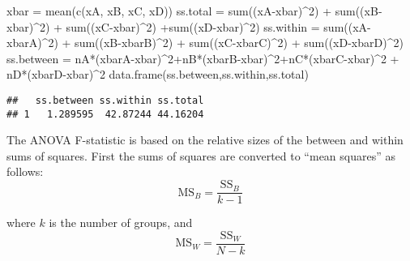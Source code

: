 \documentclass[
]{article}
\newenvironment{Shaded}{\begin{snugshade}}{\end{snugshade}}
\newcommand{\DecValTok}[1]{\textcolor[rgb]{0.00,0.00,0.81}{#1}}
\newcommand{\FunctionTok}[1]{\textcolor[rgb]{0.00,0.00,0.00}{#1}}
\newcommand{\NormalTok}[1]{#1}
\newcommand{\OtherTok}[1]{\textcolor[rgb]{0.56,0.35,0.01}{#1}}
\newcommand{\SpecialCharTok}[1]{\textcolor[rgb]{0.00,0.00,0.00}{#1}}
\begin{document}
\begin{Shaded}
\begin{Highlighting}[]
\NormalTok{xbar }\OtherTok{=} \FunctionTok{mean}\NormalTok{(}\FunctionTok{c}\NormalTok{(xA, xB, xC, xD))}
\NormalTok{ss.total }\OtherTok{=} \FunctionTok{sum}\NormalTok{((xA}\SpecialCharTok{{-}}\NormalTok{xbar)}\SpecialCharTok{\^{}}\DecValTok{2}\NormalTok{) }\SpecialCharTok{+} \FunctionTok{sum}\NormalTok{((xB}\SpecialCharTok{{-}}\NormalTok{xbar)}\SpecialCharTok{\^{}}\DecValTok{2}\NormalTok{) }\SpecialCharTok{+} \FunctionTok{sum}\NormalTok{((xC}\SpecialCharTok{{-}}\NormalTok{xbar)}\SpecialCharTok{\^{}}\DecValTok{2}\NormalTok{) }\SpecialCharTok{+}\FunctionTok{sum}\NormalTok{((xD}\SpecialCharTok{{-}}\NormalTok{xbar)}\SpecialCharTok{\^{}}\DecValTok{2}\NormalTok{)}
\NormalTok{ss.within }\OtherTok{=} \FunctionTok{sum}\NormalTok{((xA}\SpecialCharTok{{-}}\NormalTok{xbarA)}\SpecialCharTok{\^{}}\DecValTok{2}\NormalTok{) }\SpecialCharTok{+} \FunctionTok{sum}\NormalTok{((xB}\SpecialCharTok{{-}}\NormalTok{xbarB)}\SpecialCharTok{\^{}}\DecValTok{2}\NormalTok{) }\SpecialCharTok{+} \FunctionTok{sum}\NormalTok{((xC}\SpecialCharTok{{-}}\NormalTok{xbarC)}\SpecialCharTok{\^{}}\DecValTok{2}\NormalTok{) }\SpecialCharTok{+} \FunctionTok{sum}\NormalTok{((xD}\SpecialCharTok{{-}}\NormalTok{xbarD)}\SpecialCharTok{\^{}}\DecValTok{2}\NormalTok{)}
\NormalTok{ss.between }\OtherTok{=}\NormalTok{ nA}\SpecialCharTok{*}\NormalTok{(xbarA}\SpecialCharTok{{-}}\NormalTok{xbar)}\SpecialCharTok{\^{}}\DecValTok{2}\SpecialCharTok{+}\NormalTok{nB}\SpecialCharTok{*}\NormalTok{(xbarB}\SpecialCharTok{{-}}\NormalTok{xbar)}\SpecialCharTok{\^{}}\DecValTok{2}\SpecialCharTok{+}\NormalTok{nC}\SpecialCharTok{*}\NormalTok{(xbarC}\SpecialCharTok{{-}}\NormalTok{xbar)}\SpecialCharTok{\^{}}\DecValTok{2} \SpecialCharTok{+}\NormalTok{ nD}\SpecialCharTok{*}\NormalTok{(xbarD}\SpecialCharTok{{-}}\NormalTok{xbar)}\SpecialCharTok{\^{}}\DecValTok{2}
\FunctionTok{data.frame}\NormalTok{(ss.between,ss.within,ss.total)}
\end{Highlighting}
\end{Shaded}

\begin{verbatim}
##   ss.between ss.within ss.total
## 1   1.289595  42.87244 44.16204
\end{verbatim}

The ANOVA F-statistic is based on the relative sizes of the between and
within sums of squares. First the sums of squares are converted to
``mean squares'' as follows: \[
\mbox{MS}_B=\frac{\mbox{SS}_B}{k-1}
\]

where \(k\) is the number of groups, and \[
\mbox{MS}_W=\frac{\mbox{SS}_W}{N-k}
\]
\end{document}
